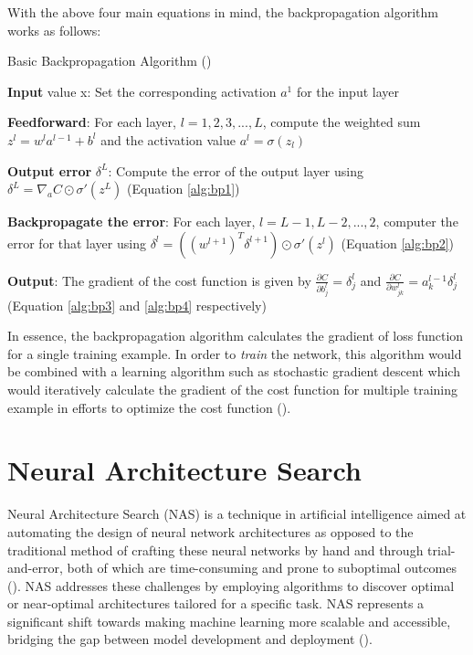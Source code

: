 \noindent With the above four main equations in mind, the backpropagation algorithm works as follows:

\begin{algorithm}[H]
	\caption{Basic Backpropagation Algorithm (\cite{nielsen2015neural})}\label{alg:backpropogation_algorithm}
	\begin{algorithmic}[1]
    \item \textbf{Input} value x: Set the corresponding activation $a^1$ for the input layer
    \item \textbf{Feedforward}: For each layer, $l=1,2,3,...,L$, compute the weighted sum $z^l=w^la^{l-1}+b^l$ and the activation value $a^l=\sigma(z_l)$
	\item \textbf{Output error} $\delta^L$: Compute the error of the output layer using $\delta^L=\nabla_aC\odot\sigma'(z^L)$ (Equation \ref{alg:bp1})
	\item \textbf{Backpropagate the error}: For each layer, $l=L-1, L-2,...,2$, computer the error for that layer using $\delta^l=((w^{l+1})^T\delta^{l+1}) \odot\sigma'(z^l)$ (Equation \ref{alg:bp2})
	\item \textbf{Output}: The gradient of the cost function is given by $\frac{\partial C}{\partial b_j^l} = \delta_j^l$ and $\frac{\partial C}{\partial w_{jk}^l} = a_k^{l-1}\delta_j^l$ (Equation \ref{alg:bp3} and \ref{alg:bp4} respectively)
\end{algorithmic}
\end{algorithm}

\noindent In essence, the backpropagation algorithm calculates the gradient of loss function for a single training example. In order to \textit{train} the network, this algorithm would be combined with a learning algorithm such as stochastic gradient descent which would iteratively calculate the gradient of the cost function for multiple training example in efforts to optimize the cost function (\cite{nielsen2015neural}). 

\section{Neural Architecture Search}\label{sec:ne_nas}
Neural Architecture Search (NAS) is a technique in artificial intelligence aimed at automating the design of neural network architectures as opposed to the traditional method of crafting these neural networks by hand and through trial-and-error, both of which are time-consuming and prone to suboptimal outcomes (\cite{ren2021comprehensive}). NAS addresses these challenges by employing algorithms to discover optimal or near-optimal architectures tailored for a specific task. NAS represents a significant shift towards making machine learning more scalable and accessible, bridging the gap between model development and deployment (\cite{elsken2019neural}). \bigskip


